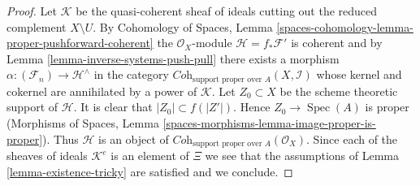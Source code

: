 \documentclass[10pt,a4paper]{amsart}
\theoremstyle{plain}
\theoremstyle{definition}
\theoremstyle{remark}
\numberwithin{equation}{subsection}
\def\Spec{\mathop{\mathrm{Spec}}}
\begin{document}
\begin{proof}
\medskip\noindent
Let $\mathcal{K}$ be the quasi-coherent sheaf of ideals cutting
out the reduced complement $X \setminus U$.
By Cohomology of Spaces, Lemma
\ref{spaces-cohomology-lemma-proper-pushforward-coherent}
the $\mathcal{O}_X$-module $\mathcal{H} = f_*\mathcal{F}'$ is coherent
and by Lemma \ref{lemma-inverse-systems-push-pull}
there exists a morphism $\alpha : (\mathcal{F}_n) \to \mathcal{H}^\wedge$
in the category $\textit{Coh}_{\text{support proper over } A}(X, \mathcal{I})$
whose kernel and cokernel are annihilated by a power of $\mathcal{K}$.
Let $Z_0 \subset X$ be the scheme theoretic support of $\mathcal{H}$.
It is clear that $|Z_0| \subset f(|Z'|)$. Hence
$Z_0 \to \Spec(A)$ is proper
(Morphisms of Spaces, Lemma
\ref{spaces-morphisms-lemma-image-proper-is-proper}).
Thus $\mathcal{H}$ is an object of 
$\textit{Coh}_{\text{support proper over } A}(\mathcal{O}_X)$.
Since each of the sheaves of ideals $\mathcal{K}^e$ is an element of
$\Xi$ we see that the assumptions of Lemma \ref{lemma-existence-tricky}
are satisfied and we conclude.
\end{proof}
\end{document}
